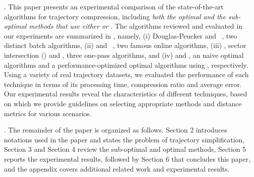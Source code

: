 \stitle{\textcolor{blue}{Contributions}}.
This paper presents an experimental comparison of the state-of-the-art \lsa algorithms for trajectory compression, including \emph{both the optimal and the sub-optimal methods that use either \ped or \sed}. 
The algorithms reviewed and evaluated in our experiments are summarized in , namely,
(i) Douglas-Peucker\cite{Douglas:Peucker,Meratnia:Spatiotemporal} and \pavlidis~\cite{Pavlidis:Segment}, two distinct batch \lsa algorithms,
(ii) \bqsa\cite{Liu:BQS} and \squishe~\cite{Muckell:SQUISH}, two famous online \lsa algorithms,
(iii) \operb\cite{Lin:Operb}, sector intersection (\siped) \cite{Williams:Longest,Sklansky:Cone,Dunham:Cone, Zhao:Sleeve} and \cised \cite{Lin:Cised}, three one-pass \lsa algorithms, and
(iv) \opt\cite{Chan:Optimal} and \optp, an naive optimal \lsa algorithms and a performance-optimized optimal algorithms using \ped, respectively.
%
%
Using a variety of real trajectory datasets, we evaluated the performance of each technique in terms of its processing time, compression ratio and average error.
Our experimental results reveal the characteristics of different techniques, based on which we provide guidelines on selecting appropriate methods and distance metrics for various scenarios.


.
The remainder of the paper is organized as follows.
Section 2 introduces notations used in the paper and states the problem of trajectory simplification,
Section 3 and Section 4 review the sub-optimal and optimal \lsa methods,
Section 5 reports the experimental results, followed by 
Section 6 that concludes this paper, and 
the appendix covers additional related work and experimental results.%



